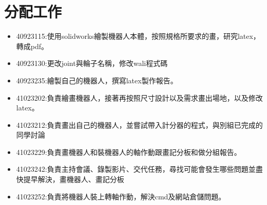 \chapter{分配工作}
\begin{itemize}
\item 40923115:使用solidworks繪製機器人本體，按照規格所要求的畫，研究latex，轉成pdf。
\item 40923130:更改joint與輪子名稱，修改wali程式碼 
\item 40923235:繪製自己的機器人，撰寫latex製作報告。
\item 41023202:負責繪畫機器人，接著再按照尺寸設計以及需求畫出場地，以及修改latex。 
\item 41023212:負責畫出自己的機器人，並嘗試帶入計分器的程式，與別組已完成的同學討論 
\item 41023229:負責畫機器人和裝機器人的軸作動跟畫記分板和做分組報告。 
\item 41023242:負責主持會議、錄製影片、交代任務，尋找可能會發生哪些問題並盡快提早解決，畫機器人、畫記分板 
\item 41023252:負責將機器人裝上轉軸作動，解決cmd及網站倉儲問題。 
\end{itemize}
\newpage
